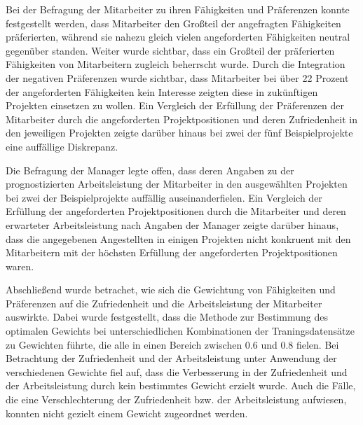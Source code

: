 Bei der Befragung der Mitarbeiter zu ihren Fähigkeiten und Präferenzen konnte festgestellt werden, dass Mitarbeiter den Großteil der angefragten Fähigkeiten präferierten, während sie nahezu gleich vielen angeforderten Fähigkeiten neutral gegenüber standen.
Weiter wurde sichtbar, dass ein Großteil der präferierten Fähigkeiten von Mitarbeitern zugleich beherrscht wurde.
Durch die Integration der negativen Präferenzen wurde sichtbar, dass Mitarbeiter bei über 22 Prozent der angeforderten Fähigkeiten kein Interesse zeigten diese in zukünftigen Projekten einsetzen zu wollen.
Ein Vergleich der Erfüllung der Präferenzen der Mitarbeiter durch die angeforderten Projektpositionen und deren Zufriedenheit in den jeweiligen Projekten zeigte darüber hinaus bei zwei der fünf Beispielprojekte eine auffällige Diskrepanz.

Die Befragung der Manager legte offen, dass deren Angaben zu der prognostizierten Arbeitsleistung der Mitarbeiter in den ausgewählten Projekten bei zwei der Beispielprojekte auffällig auseinanderfielen. 
Ein Vergleich der Erfüllung der angeforderten Projektpositionen durch die Mitarbeiter und deren erwarteter Arbeitsleistung nach Angaben der Manager zeigte darüber hinaus, dass die angegebenen Angestellten in einigen Projekten nicht konkruent mit den Mitarbeitern mit der höchsten Erfüllung der angeforderten Projektpositionen waren.

Abschließend wurde betrachet, wie sich die Gewichtung von Fähigkeiten und Präferenzen auf die Zufriedenheit und die Arbeitsleistung der Mitarbeiter auswirkte.
Dabei wurde festgestellt, dass die Methode zur Bestimmung des optimalen Gewichts bei unterschiedlichen Kombinationen der Traningsdatensätze zu Gewichten führte, die alle in einen Bereich zwischen 0.6 und 0.8 fielen.
Bei Betrachtung der Zufriedenheit und der Arbeitsleistung unter Anwendung der verschiedenen Gewichte fiel auf, dass die Verbesserung in der Zufriedenheit und der Arbeitsleistung durch kein bestimmtes Gewicht erzielt wurde.
Auch die Fälle, die eine Verschlechterung der Zufriedenheit bzw. der Arbeitsleistung aufwiesen, konnten nicht gezielt einem Gewicht zugeordnet werden.

